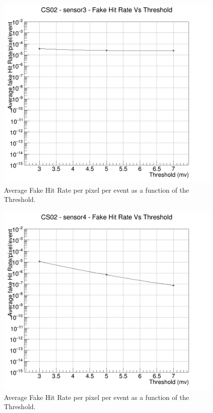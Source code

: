 \documentclass[a4papper, 10pt]{article}
\begin{document}
          \begin{figure}[!h]
            \centering
            \includegraphics[width = 12cm]{Output_CS02_FHR/Fake_results_CS02_sensor3.png}
            \caption{Average Fake Hit Rate per pixel per event as a function of the Threshold.}
        \end{figure}
    \FloatBarrier 
        \begin{figure}[!h]
            \centering
            \includegraphics[width = 12cm]{Output_CS02_FHR/Fake_results_CS02_sensor4.png}
            \caption{Average Fake Hit Rate per pixel per event as a function of the Threshold.}
        \end{figure}
    \FloatBarrier 
\end{document}
